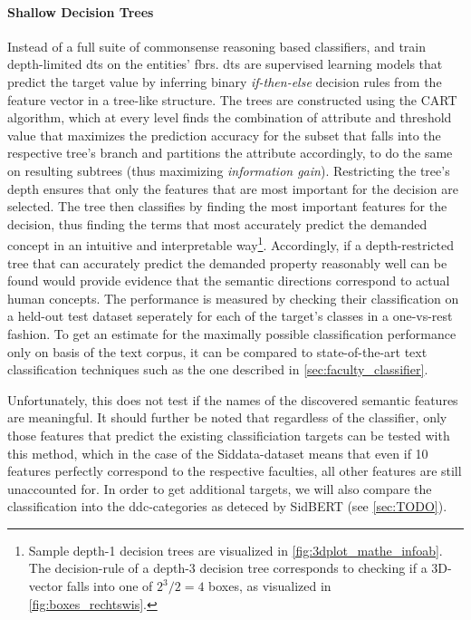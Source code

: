 \paragraph{Shallow Decision Trees} Instead of a full suite of commonsense reasoning based classifiers, \cite{Ager2018} and \cite{Alshaikh2020} train depth-limited \glspl{dt} \cite{breiman1984classification} on the entities' \glspl{fbr}. \Glspl{dt} are supervised learning models that predict the target value by inferring binary \textit{if-then-else} decision rules from the feature vector in a tree-like structure. The trees are constructed using the CART algorithm, which at every level finds the combination of attribute and threshold value that maximizes the prediction accuracy for the subset that falls into the respective tree's branch and partitions the attribute accordingly, to do the same on resulting subtrees (thus maximizing \emph{information gain}). %
Restricting the tree's depth ensures that only the features that are most important for the decision are selected. The tree then classifies by finding the most important features for the decision, thus finding the terms that most accurately predict the demanded concept in an intuitive and interpretable way\footnote{Sample depth-1 decision trees are visualized in \autoref{fig:3dplot_mathe_infoab}. The decision-rule of a depth-3 decision tree corresponds to checking if a 3D-vector falls into one of $2^3/2=4$ boxes, as visualized in \autoref{fig:boxes_rechtswis}.}. Accordingly, if a depth-restricted tree that can accurately predict the demanded property reasonably well can be found would provide evidence that the semantic directions correspond to actual human concepts. The performance is measured by checking their classification on a held-out test dataset seperately for each of the target's classes in a one-vs-rest fashion. To get an estimate for the maximally possible classification performance only on basis of the text corpus, it can be compared to state-of-the-art text classification techniques such as the one described in \autoref{sec:faculty_classifier}.

Unfortunately, this does not test if the names of the discovered semantic features are meaningful. It should further be noted that regardless of the classifier, only those features that predict the existing classificiation targets can be tested with this method, which in the case of the Siddata-dataset means that even if 10 features perfectly correspond to the respective faculties, all other features are still unaccounted for. In order to get additional targets, we will also compare the classification into the \gls{ddc}-categories as deteced by SidBERT (see \autoref{sec:TODO}).

